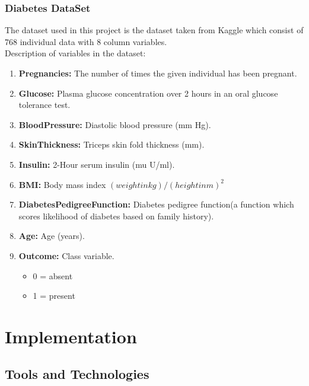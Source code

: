 \documentclass[oneside,12pt]{Classes/VTU}
\begin{document}
	\subsection{Diabetes DataSet}
	The dataset used in this project is the dataset taken from Kaggle which consist of 768 individual data with 8 column variables.\\
	Description of variables in the dataset:
	\begin{enumerate}
		\item \textbf{Pregnancies:} The number of times the given individual has been pregnant.
		\item \textbf{Glucose:} Plasma glucose concentration over 2 hours in an oral glucose tolerance test.
		\item \textbf{BloodPressure:} Diastolic blood pressure (mm Hg).
		\item \textbf{SkinThickness:} Triceps skin fold thickness (mm).
		\item \textbf{Insulin:} 2-Hour serum insulin (mu U/ml).
		\item \textbf{BMI:} Body mass index $(weight in kg)/(height in m)^2$
		\item \textbf{DiabetesPedigreeFunction:} Diabetes pedigree function(a function which scores likelihood of diabetes based on family history).
		\item \textbf{Age:} Age (years).
		\item \textbf{Outcome:} Class variable.
		\begin{itemize}
			\item 0 = absent
			\item 1 = present
		\end{itemize}
		
	\end{enumerate}
	
	\chapter{Implementation}
	\section{Tools and Technologies}
\end{document}
